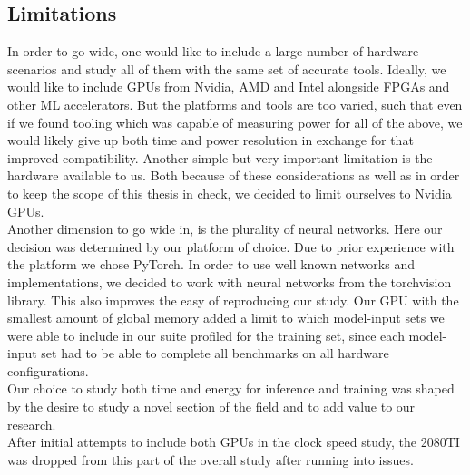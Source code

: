 \subsection{Limitations}
In order to go wide, one would like to include a large number of hardware scenarios and study all of them with the same set of accurate tools. Ideally, we would like to include GPUs from Nvidia, AMD and Intel alongside FPGAs and other ML accelerators. But the platforms and tools are too varied, such that even if we found tooling which was capable of measuring power for all of the above, we would likely give up both time and power resolution in exchange for that improved compatibility. Another simple but very important limitation is the hardware available to us. Both because of these considerations as well as in order to keep the scope of this thesis in check, we decided to limit ourselves to Nvidia GPUs. \\
Another dimension to go wide in, is the plurality of neural networks. Here our decision was determined by our platform of choice. Due to prior experience with the platform we chose PyTorch. In order to use well known networks and implementations, we decided to work with neural networks from the torchvision library. This also improves the easy of reproducing our study. Our GPU with the smallest amount of global memory added a limit to which model-input sets we were able to include in our suite profiled for the training set, since each model-input set had to be able to complete all benchmarks on all hardware configurations. \\
Our choice to study both time and energy for inference and training was shaped by the desire to study a novel section of the field and to add value to our research.  \\
After initial attempts to include both GPUs in the clock speed study, the 2080TI was dropped from this part of the overall study after running into issues.

